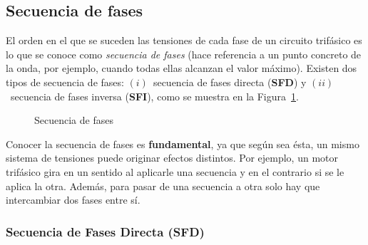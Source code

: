 	\subsection{Secuencia de fases}\label{sec.secuencia_fases}
	
	El orden en el que se suceden las tensiones de cada fase de un circuito trifásico es lo que se conoce como \textit{secuencia de fases} (hace referencia a un punto concreto de la onda, por ejemplo, cuando todas ellas alcanzan el valor máximo). Existen dos tipos de secuencia de fases: $(i)$~secuencia de fases directa (\textbf{SFD}) y $(ii)$~secuencia de fases inversa (\textbf{SFI}), como se muestra en la Figura~\ref{fig.secuencia_fases}. 
	\begin{figure}[H]
		\centering
		\hfil
		\caption{Secuencia de fases}
		\label{fig.secuencia_fases}
	\end{figure}
	
	
	Conocer la secuencia de fases es \textbf{fundamental}, ya que según sea ésta, un mismo sistema de tensiones puede originar efectos distintos. Por ejemplo, un motor trifásico gira en un sentido al aplicarle
	una secuencia y en el contrario si se le aplica la otra. Además, para pasar de una secuencia a otra solo hay que intercambiar dos fases entre sí.
	
	\subsubsection{Secuencia de Fases Directa (SFD)}
	
